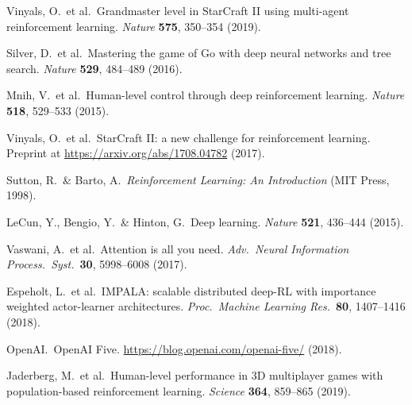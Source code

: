 \documentclass[11pt,a4paper]{article}
\begin{document}
\begin{enumerate}[nosep, label={[\arabic*]}]
    \item Vinyals, O.\ et al.\ Grandmaster level in StarCraft II using multi-agent reinforcement learning. \textit{Nature} \textbf{575}, 350--354 (2019).
    \item Silver, D.\ et al.\ Mastering the game of Go with deep neural networks and tree search. \textit{Nature} \textbf{529}, 484--489 (2016).
    \item Mnih, V.\ et al.\ Human-level control through deep reinforcement learning. \textit{Nature} \textbf{518}, 529--533 (2015).
    \item Vinyals, O.\ et al.\ StarCraft II: a new challenge for reinforcement learning. Preprint at \url{https://arxiv.org/abs/1708.04782} (2017).
    \item Sutton, R.\ \& Barto, A.\ \textit{Reinforcement Learning: An Introduction} (MIT Press, 1998).
    \item LeCun, Y., Bengio, Y.\ \& Hinton, G.\ Deep learning. \textit{Nature} \textbf{521}, 436--444 (2015).
    \item Vaswani, A.\ et al.\ Attention is all you need. \textit{Adv.\ Neural Information Process.\ Syst.}\ \textbf{30}, 5998--6008 (2017).
    \item Espeholt, L.\ et al.\ IMPALA: scalable distributed deep-RL with importance weighted actor-learner architectures. \textit{Proc.\ Machine Learning Res.}\ \textbf{80}, 1407--1416 (2018).
    \item OpenAI.\ OpenAI Five. \url{https://blog.openai.com/openai-five/} (2018).
    \item Jaderberg, M.\ et al.\ Human-level performance in 3D multiplayer games with population-based reinforcement learning. \textit{Science} \textbf{364}, 859--865 (2019).
\end{enumerate}
\end{document}
